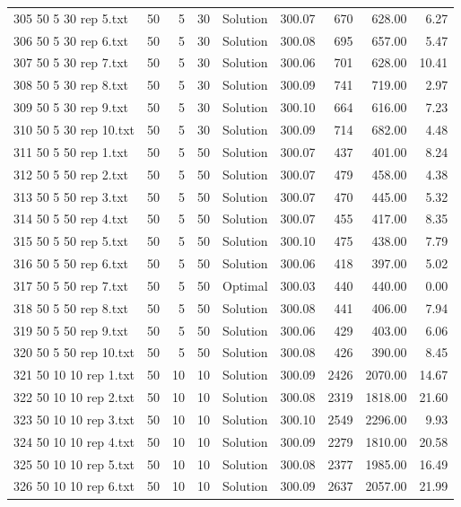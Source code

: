 \begin{longtable}{lrrllrrrr}
305 50 5 30 rep 5.txt & 50 & 5 & 30 & Solution & 300.07 & 670 & 628.00 &  6.27\\
306 50 5 30 rep 6.txt & 50 & 5 & 30 & Solution & 300.08 & 695 & 657.00 &  5.47\\
307 50 5 30 rep 7.txt & 50 & 5 & 30 & Solution & 300.06 & 701 & 628.00 & 10.41\\
308 50 5 30 rep 8.txt & 50 & 5 & 30 & Solution & 300.09 & 741 & 719.00 &  2.97\\
309 50 5 30 rep 9.txt & 50 & 5 & 30 & Solution & 300.10 & 664 & 616.00 &  7.23\\
310 50 5 30 rep 10.txt & 50 & 5 & 30 & Solution & 300.09 & 714 & 682.00 &  4.48\\
311 50 5 50 rep 1.txt & 50 & 5 & 50 & Solution & 300.07 & 437 & 401.00 &  8.24\\
312 50 5 50 rep 2.txt & 50 & 5 & 50 & Solution & 300.07 & 479 & 458.00 &  4.38\\
313 50 5 50 rep 3.txt & 50 & 5 & 50 & Solution & 300.07 & 470 & 445.00 &  5.32\\
314 50 5 50 rep 4.txt & 50 & 5 & 50 & Solution & 300.07 & 455 & 417.00 &  8.35\\
315 50 5 50 rep 5.txt & 50 & 5 & 50 & Solution & 300.10 & 475 & 438.00 &  7.79\\
316 50 5 50 rep 6.txt & 50 & 5 & 50 & Solution & 300.06 & 418 & 397.00 &  5.02\\
317 50 5 50 rep 7.txt & 50 & 5 & 50 & Optimal & 300.03 & 440 & 440.00 &  0.00\\
318 50 5 50 rep 8.txt & 50 & 5 & 50 & Solution & 300.08 & 441 & 406.00 &  7.94\\
319 50 5 50 rep 9.txt & 50 & 5 & 50 & Solution & 300.06 & 429 & 403.00 &  6.06\\
320 50 5 50 rep 10.txt & 50 & 5 & 50 & Solution & 300.08 & 426 & 390.00 &  8.45\\
321 50 10 10 rep 1.txt & 50 & 10 & 10 & Solution & 300.09 & 2426 & 2070.00 & 14.67\\
322 50 10 10 rep 2.txt & 50 & 10 & 10 & Solution & 300.08 & 2319 & 1818.00 & 21.60\\
323 50 10 10 rep 3.txt & 50 & 10 & 10 & Solution & 300.10 & 2549 & 2296.00 &  9.93\\
324 50 10 10 rep 4.txt & 50 & 10 & 10 & Solution & 300.09 & 2279 & 1810.00 & 20.58\\
325 50 10 10 rep 5.txt & 50 & 10 & 10 & Solution & 300.08 & 2377 & 1985.00 & 16.49\\
326 50 10 10 rep 6.txt & 50 & 10 & 10 & Solution & 300.09 & 2637 & 2057.00 & 21.99\\

\end{longtable}
